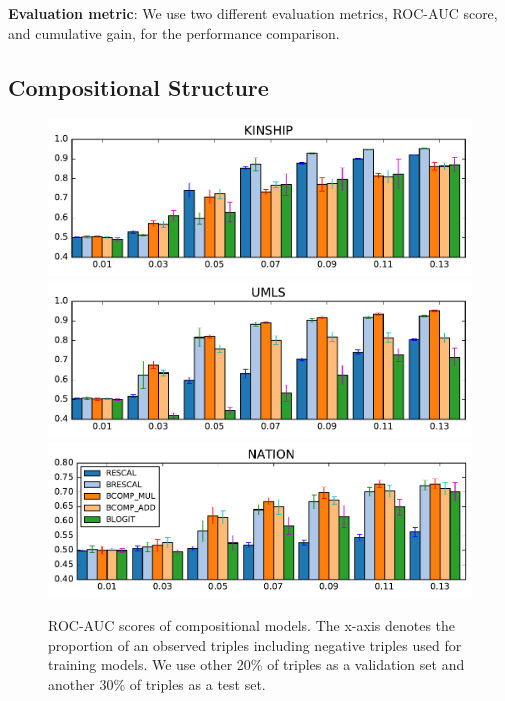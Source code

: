 \textbf{Evaluation metric}: We use two different evaluation metrics, ROC-AUC score, and cumulative gain, for the performance comparison. 

\subsection{Compositional Structure}
\begin{figure}[t]
	\centering
	\includegraphics[width=\linewidth]{images/comp_training_error_kinship_small.pdf}
	\includegraphics[width=\linewidth]{images/comp_training_error_umls_small.pdf}			
	\includegraphics[width=\linewidth]{images/comp_training_error_nation_small.pdf}				
	\caption{\label{fig:r_vs_br} ROC-AUC scores of compositional models. The x-axis denotes the proportion of an observed triples including negative triples used for training models. We use other 20\% of triples as a validation set and another 30\% of triples as a test set. 
}
\end{figure} 

